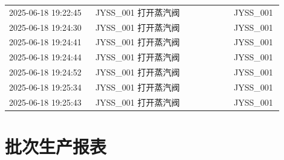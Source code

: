 \documentclass[UTF8,10pt,a4paper,fontset=fandol]{ctexart}
\begin{document}
\begin{center}
\begin{tabular}{|p{0.30\linewidth}|p{0.48\linewidth}|p{0.12\linewidth}|}
2025-06-18 19:22:45 & JYSS\_001 打开蒸汽阀 & JYSS\_001 \\
2025-06-18 19:24:30 & JYSS\_001 打开蒸汽阀 & JYSS\_001 \\
2025-06-18 19:24:41 & JYSS\_001 打开蒸汽阀 & JYSS\_001 \\
2025-06-18 19:24:44 & JYSS\_001 打开蒸汽阀 & JYSS\_001 \\
2025-06-18 19:24:52 & JYSS\_001 打开蒸汽阀 & JYSS\_001 \\
2025-06-18 19:25:34 & JYSS\_001 打开蒸汽阀 & JYSS\_001 \\
2025-06-18 19:25:43 & JYSS\_001 打开蒸汽阀 & JYSS\_001 \\
\hline
\end{tabular}
\end{center}

\newpage

\section*{批次生产报表}
\end{document}
